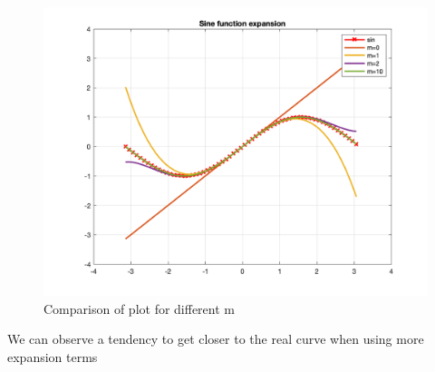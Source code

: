 \documentclass{article}
\begin{document}
\begin{figure}[H]
   \centering
   \includegraphics[width=.8\columnwidth]
   {imgs/sin_expansion.png}
   \caption{Comparison of plot for different m}
\end{figure}
We can observe a tendency to get closer to the real curve when using more expansion terms
\end{document}

